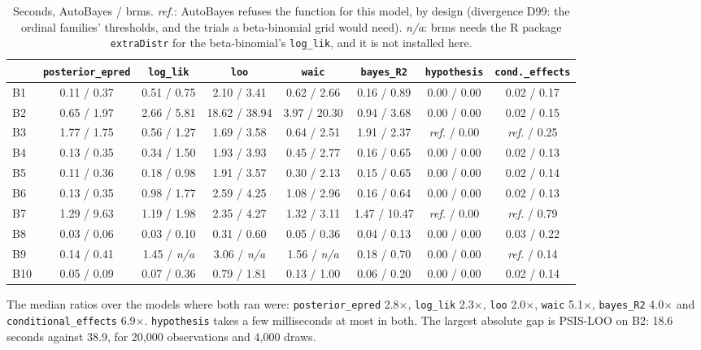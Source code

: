 \documentclass[11pt]{article}
\newcommand{\code}[1]{\texttt{#1}}
\begin{document}
\begin{table}[h]
\footnotesize
\setlength{\tabcolsep}{3.5pt}
\begin{center}\begin{tabular}{@{}lccccccc@{}}
\toprule
& \code{posterior\_epred} & \code{log\_lik} & \code{loo} & \code{waic} & \code{bayes\_R2} & \code{hypothesis} & \code{cond.\_effects} \\
\midrule
B1 & 0.11 / 0.37 & 0.51 / 0.75 & 2.10 / 3.41 & 0.62 / 2.66 & 0.16 / 0.89 & 0.00 / 0.00 & 0.02 / 0.17 \\
B2 & 0.65 / 1.97 & 2.66 / 5.81 & 18.62 / 38.94 & 3.97 / 20.30 & 0.94 / 3.68 & 0.00 / 0.00 & 0.02 / 0.15 \\
B3 & 1.77 / 1.75 & 0.56 / 1.27 & 1.69 / 3.58 & 0.64 / 2.51 & 1.91 / 2.37 & \textit{ref.} / 0.00 & \textit{ref.} / 0.25 \\
B4 & 0.13 / 0.35 & 0.34 / 1.50 & 1.93 / 3.93 & 0.45 / 2.77 & 0.16 / 0.65 & 0.00 / 0.00 & 0.02 / 0.13 \\
B5 & 0.11 / 0.36 & 0.18 / 0.98 & 1.91 / 3.57 & 0.30 / 2.13 & 0.15 / 0.65 & 0.00 / 0.00 & 0.02 / 0.14 \\
B6 & 0.13 / 0.35 & 0.98 / 1.77 & 2.59 / 4.25 & 1.08 / 2.96 & 0.16 / 0.64 & 0.00 / 0.00 & 0.02 / 0.13 \\
B7 & 1.29 / 9.63 & 1.19 / 1.98 & 2.35 / 4.27 & 1.32 / 3.11 & 1.47 / 10.47 & \textit{ref.} / 0.00 & \textit{ref.} / 0.79 \\
B8 & 0.03 / 0.06 & 0.03 / 0.10 & 0.31 / 0.60 & 0.05 / 0.36 & 0.04 / 0.13 & 0.00 / 0.00 & 0.03 / 0.22 \\
B9 & 0.14 / 0.41 & 1.45 / \textit{n/a} & 3.06 / \textit{n/a} & 1.56 / \textit{n/a} & 0.18 / 0.70 & 0.00 / 0.00 & \textit{ref.} / 0.14 \\
B10 & 0.05 / 0.09 & 0.07 / 0.36 & 0.79 / 1.81 & 0.13 / 1.00 & 0.06 / 0.20 & 0.00 / 0.00 & 0.02 / 0.14 \\
\bottomrule
\end{tabular}\end{center}
\caption{\small Seconds, AutoBayes / brms. \textit{ref.}: AutoBayes refuses the function for this model, by design
(divergence D99: the ordinal families' thresholds, and the trials a beta-binomial grid would need). \textit{n/a}: brms
needs the R package \code{extraDistr} for the beta-binomial's \code{log\_lik}, and it is not installed here.}\label{tab:post}
\end{table}

\noindent The median ratios over the models where both ran were: \code{posterior\_epred} 2.8$\times$,
\code{log\_lik} 2.3$\times$, \code{loo} 2.0$\times$, \code{waic} 5.1$\times$, \code{bayes\_R2} 4.0$\times$ and
\code{conditional\_effects} 6.9$\times$. \code{hypothesis} takes a few milliseconds at most in both. The largest absolute
gap is PSIS-LOO on B2: 18.6 seconds against 38.9, for 20,000 observations and 4,000 draws.
\end{document}
